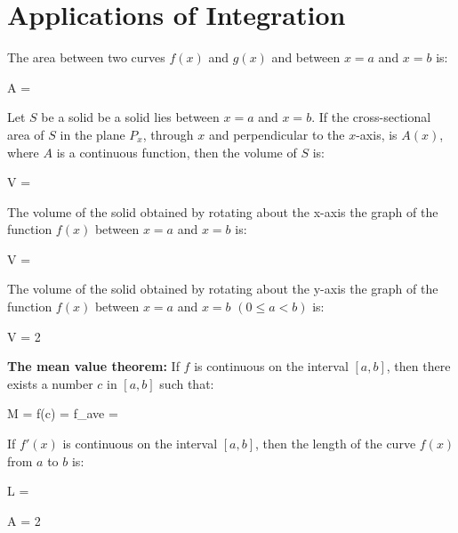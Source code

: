 \chapter{Applications of Integration}

    \par The area between two curves $f(x)$ and $g(x)$ and between
    $x = a$ and $x = b$ is:
    \begin{eqbox}
        A = 
    \end{eqbox}

    \par Let $S$ be a solid be a solid lies between $x = a$ and $x = b$.
    If the cross-sectional area of $S$ in the plane $P_{x}$, through $x$
    and perpendicular to the $x$-axis, is $A(x)$, where $A$ is a continuous
    function, then the volume of $S$ is:
    \begin{eqbox}
        V = 
    \end{eqbox}
    \par The volume of the solid obtained by rotating about the x-axis the
    graph of the function $f(x)$ between $x = a$ and $x = b$ is:
    \begin{eqbox}
        V = \pi {}
    \end{eqbox}

    \par The volume of the solid obtained by rotating about the y-axis the
    graph of the function $f(x)$ between $x = a$ and $x = b$ $(0 \leq a < b)$ is:
    \begin{eqbox}
        V = 2 \pi {}
    \end{eqbox}

    \par \textbf{The mean value theorem:} If $f$ is continuous on the interval
    $[a, b]$, then there exists a number $c$ in $[a, b]$ such that:
    \begin{eqbox}
        M = f(c) = f_{ave} =  
    \end{eqbox}

    \par If $f'(x)$ is continuous on the interval $[a, b]$, then the length of the
    curve $f(x)$ from $a$ to $b$ is:
    \begin{eqbox}
        L = 
    \end{eqbox}

    \begin{eqbox}
        A = 2 \pi {}
    \end{eqbox}
    
